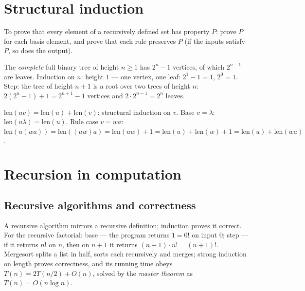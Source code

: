 \section{Structural induction}

\begin{theorem}
To prove that every element of a recursively defined set has property $P$:
prove $P$ for each basis element, and prove that each rule preserves $P$
(if the inputs satisfy $P$, so does the output).
\end{theorem}

\begin{example}\label{ex:tree}
The \emph{complete} full binary tree of height $n \geq 1$ has $2^{n} - 1$
vertices, of which $2^{n-1}$ are leaves. Induction on $n$: height $1$ ---
one vertex, one leaf: $2^1 - 1 = 1$, $2^{0} = 1$. Step: the tree of height
$n+1$ is a root over two trees of height $n$:
$2(2^{n} - 1) + 1 = 2^{n+1} - 1$ vertices and $2 \cdot 2^{n-1} = 2^{n}$
leaves.
\end{example}

\begin{example}[Strings]
$\mathrm{len}(uv) = \mathrm{len}(u) + \mathrm{len}(v)$: structural induction
on $v$. Base $v = \lambda$: $\mathrm{len}(u\lambda) = \mathrm{len}(u)$.
Rule case $v = wa$:
$\mathrm{len}(u(wa)) = \mathrm{len}((uw)a) = \mathrm{len}(uw) + 1
= \mathrm{len}(u) + \mathrm{len}(w) + 1 = \mathrm{len}(u) +
\mathrm{len}(wa)$.
\end{example}

\section{Recursion in computation}

\subsection{Recursive algorithms and correctness}

A recursive algorithm mirrors a recursive definition; induction proves it
correct. For the recursive factorial: base --- the program returns $1 = 0!$
on input $0$; step --- if it returns $n!$ on $n$, then on $n + 1$ it
returns $(n+1) \cdot n! = (n+1)!$. Mergesort splits a list in half, sorts
each recursively and merges; strong induction on length proves correctness,
and its running time obeys $T(n) = 2T(n/2) + O(n)$, solved by the
\emph{master theorem} as $T(n) = O(n \log n)$.

